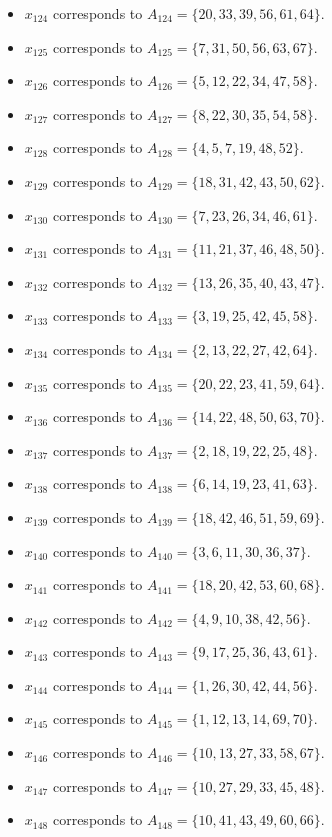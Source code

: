 \documentclass[11pt]{article}
\begin{document}
\begin{itemize}
\item $x_{124}$ corresponds to $A_{124}=\{20, 33, 39, 56, 61, 64\}$.
\item $x_{125}$ corresponds to $A_{125}=\{7, 31, 50, 56, 63, 67\}$.
\item $x_{126}$ corresponds to $A_{126}=\{5, 12, 22, 34, 47, 58\}$.
\item $x_{127}$ corresponds to $A_{127}=\{8, 22, 30, 35, 54, 58\}$.
\item $x_{128}$ corresponds to $A_{128}=\{4, 5, 7, 19, 48, 52\}$.
\item $x_{129}$ corresponds to $A_{129}=\{18, 31, 42, 43, 50, 62\}$.
\item $x_{130}$ corresponds to $A_{130}=\{7, 23, 26, 34, 46, 61\}$.
\item $x_{131}$ corresponds to $A_{131}=\{11, 21, 37, 46, 48, 50\}$.
\item $x_{132}$ corresponds to $A_{132}=\{13, 26, 35, 40, 43, 47\}$.
\item $x_{133}$ corresponds to $A_{133}=\{3, 19, 25, 42, 45, 58\}$.
\item $x_{134}$ corresponds to $A_{134}=\{2, 13, 22, 27, 42, 64\}$.
\item $x_{135}$ corresponds to $A_{135}=\{20, 22, 23, 41, 59, 64\}$.
\item $x_{136}$ corresponds to $A_{136}=\{14, 22, 48, 50, 63, 70\}$.
\item $x_{137}$ corresponds to $A_{137}=\{2, 18, 19, 22, 25, 48\}$.
\item $x_{138}$ corresponds to $A_{138}=\{6, 14, 19, 23, 41, 63\}$.
\item $x_{139}$ corresponds to $A_{139}=\{18, 42, 46, 51, 59, 69\}$.
\item $x_{140}$ corresponds to $A_{140}=\{3, 6, 11, 30, 36, 37\}$.
\item $x_{141}$ corresponds to $A_{141}=\{18, 20, 42, 53, 60, 68\}$.
\item $x_{142}$ corresponds to $A_{142}=\{4, 9, 10, 38, 42, 56\}$.
\item $x_{143}$ corresponds to $A_{143}=\{9, 17, 25, 36, 43, 61\}$.
\item $x_{144}$ corresponds to $A_{144}=\{1, 26, 30, 42, 44, 56\}$.
\item $x_{145}$ corresponds to $A_{145}=\{1, 12, 13, 14, 69, 70\}$.
\item $x_{146}$ corresponds to $A_{146}=\{10, 13, 27, 33, 58, 67\}$.
\item $x_{147}$ corresponds to $A_{147}=\{10, 27, 29, 33, 45, 48\}$.
\item $x_{148}$ corresponds to $A_{148}=\{10, 41, 43, 49, 60, 66\}$.

\end{itemize}
\end{document}
